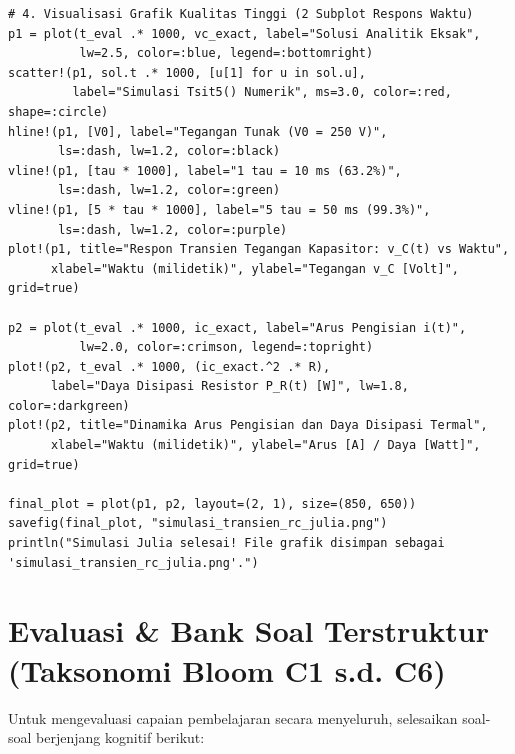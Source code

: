 \documentclass[11pt,a4paper]{article}
\theoremstyle{definition}
\begin{document}
\begin{lstlisting}[style=juliastyle, caption={Skrip Julia: Simulasi Transien Pengisian dan Pengosongan Rangkaian RC Berbasis DifferentialEquations.jl.}]
# 4. Visualisasi Grafik Kualitas Tinggi (2 Subplot Respons Waktu)
p1 = plot(t_eval .* 1000, vc_exact, label="Solusi Analitik Eksak",
          lw=2.5, color=:blue, legend=:bottomright)
scatter!(p1, sol.t .* 1000, [u[1] for u in sol.u],
         label="Simulasi Tsit5() Numerik", ms=3.0, color=:red, shape=:circle)
hline!(p1, [V0], label="Tegangan Tunak (V0 = 250 V)",
       ls=:dash, lw=1.2, color=:black)
vline!(p1, [tau * 1000], label="1 tau = 10 ms (63.2%)",
       ls=:dash, lw=1.2, color=:green)
vline!(p1, [5 * tau * 1000], label="5 tau = 50 ms (99.3%)",
       ls=:dash, lw=1.2, color=:purple)
plot!(p1, title="Respon Transien Tegangan Kapasitor: v_C(t) vs Waktu",
      xlabel="Waktu (milidetik)", ylabel="Tegangan v_C [Volt]", grid=true)

p2 = plot(t_eval .* 1000, ic_exact, label="Arus Pengisian i(t)",
          lw=2.0, color=:crimson, legend=:topright)
plot!(p2, t_eval .* 1000, (ic_exact.^2 .* R),
      label="Daya Disipasi Resistor P_R(t) [W]", lw=1.8, color=:darkgreen)
plot!(p2, title="Dinamika Arus Pengisian dan Daya Disipasi Termal",
      xlabel="Waktu (milidetik)", ylabel="Arus [A] / Daya [Watt]", grid=true)

final_plot = plot(p1, p2, layout=(2, 1), size=(850, 650))
savefig(final_plot, "simulasi_transien_rc_julia.png")
println("Simulasi Julia selesai! File grafik disimpan sebagai 'simulasi_transien_rc_julia.png'.")
\end{lstlisting}

\section{Evaluasi \& Bank Soal Terstruktur (Taksonomi Bloom C1 s.d. C6)}

Untuk mengevaluasi capaian pembelajaran secara menyeluruh, selesaikan soal-soal berjenjang kognitif berikut:
\end{document}

